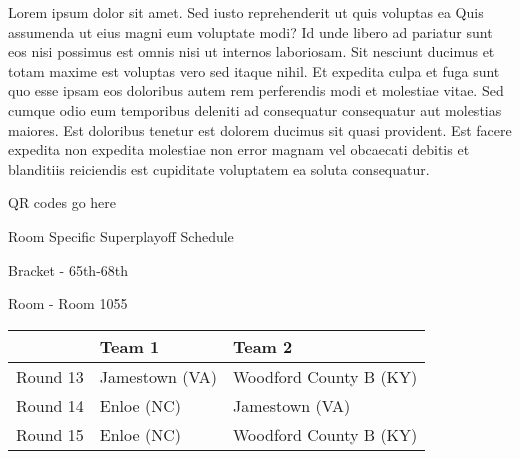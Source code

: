 \documentclass{article}%
\begin{document}
\vspace*{8pt}%
\newline%
Lorem ipsum dolor sit amet. Sed iusto reprehenderit ut quis voluptas ea Quis assumenda ut eius magni eum voluptate modi? Id unde libero ad pariatur sunt eos nisi possimus est omnis nisi ut internos laboriosam. Sit nesciunt ducimus et totam maxime est voluptas vero sed itaque nihil. Et expedita culpa et fuga sunt quo esse ipsam eos doloribus autem rem perferendis modi et molestiae vitae.\newline%
\newline%
Sed cumque odio eum temporibus deleniti ad consequatur consequatur aut molestias maiores. Est doloribus tenetur est dolorem ducimus sit quasi provident. Est facere expedita non expedita molestiae non error magnam vel obcaecati debitis et blanditiis reiciendis est cupiditate voluptatem ea soluta consequatur.%
\vspace*{140pt}%
\begin{center}%
\begin{Huge}%
QR codes go here%
\end{Huge}%
\end{center}%
\newpage%
\begin{center}%
\begin{Huge}%
Room Specific Superplayoff Schedule%
\end{Huge}%
\vspace*{8pt}%
\linebreak%
\begin{Large}%
Bracket {-} 65th{-}68th%
\end{Large}%
\vspace*{8pt}%
\linebreak%
\vspace*{8pt}%
\begin{Large}%
Room {-} Room 1055%
\end{Large}%
\end{center}%
%
\begin{tabularx}{\textwidth}{|c|Y|Y|}%
\hline%
&Team 1&Team 2\\%
\hline%
Round 13&Jamestown (VA)&Woodford County B (KY)\\%
Round 14&Enloe (NC)&Jamestown (VA)\\%
Round 15&Enloe (NC)&Woodford County B (KY)\\%
\hline%
\end{tabularx}%
\vspace*{8pt}%
\newline%
\end{document}
